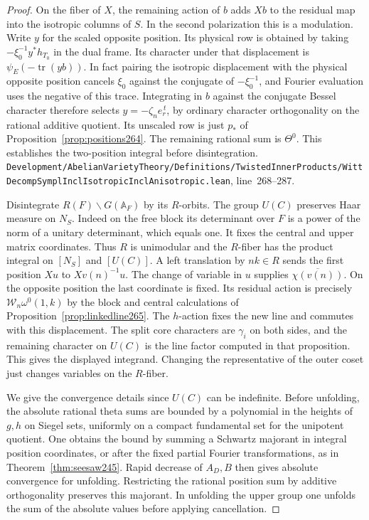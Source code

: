 \documentclass[a4paper,11pt]{article}
\theoremstyle{definition}
\theoremstyle{remark}
\newcommand{\srcloc}[2]{{\small\nolinkurl{#1.lean}}, line~#2}
\numberwithin{equation}{section}
\begin{document}
\begin{proof}
On the fiber of \(X\), the remaining action of \(b\) adds
\(Xb\) to the residual map into the isotropic columns of \(S\).
In the second polarization this is a modulation. Write \(y\)
for the scaled opposite position. Its physical row is obtained
by taking \(-\xi_0^{-1}y^*h_{T_0}\) in the dual frame.
Its character under that displacement is
\(\psi_E(-\operatorname{tr}(yb))\). In fact pairing the
isotropic displacement with the physical opposite position
cancels \(\xi_0\) against the conjugate of \(-\xi_0^{-1}\),
and Fourier evaluation uses the negative of this trace. Integrating
in \(b\) against the conjugate Bessel character therefore
selects \(y=-\zeta_n e_r^{\,t}\), by ordinary character
orthogonality on the rational additive quotient. Its unscaled
row is just \(p_*\) of Proposition~\ref{prop:positions264}.
The remaining rational sum is \(\Theta^0\). This establishes
the two-position integral before disintegration.
\srcloc{Development/AbelianVarietyTheory/Definitions/TwistedInnerProducts/WittDecompSymplInclIsotropicInclAnisotropic}{268--287}.

Disintegrate \(R(F)\backslash G(\mathbb A_F)\) by its \(R\)-orbits.
The group \(U(C)\) preserves Haar measure on \(N_S\). Indeed on
the free block its determinant over \(F\) is a power of the
norm of a unitary determinant, which equals one. It fixes the
central and upper matrix coordinates. Thus \(R\) is unimodular
and the \(R\)-fiber has the product integral on \([N_S]\) and
\([U(C)]\). A left translation by \(nk\in R\) sends the first
position \(Xu\) to \(Xv(n)^{-1}u\). The change of variable
in \(u\) supplies \(\overline{\chi(v(n))}\). On the opposite
position the last coordinate is fixed. Its residual action is
precisely \(\mathcal W_n\omega^0(1,k)\) by the block and
central calculations of Proposition~\ref{prop:linkedline265}.
The \(h\)-action fixes the new line and commutes with this
displacement. The split core characters are \(\gamma_i\) on both
sides, and the remaining character on \(U(C)\) is the line factor
computed in that proposition. This gives the displayed integrand.
Changing the representative of the outer coset just changes
variables on the \(R\)-fiber.

We give the convergence details since \(U(C)\) can be
indefinite. Before unfolding, the absolute rational theta
sums are bounded by a polynomial in the heights of \(g,h\)
on Siegel sets, uniformly on a compact fundamental set for
the unipotent quotient. One obtains the bound by summing a
Schwartz majorant in integral position coordinates, or after
the fixed partial Fourier transformations, as in
Theorem~\ref{thm:seesaw245}. Rapid decrease of \(A_D,B\)
then gives absolute convergence for unfolding. Restricting
the rational position sum by additive orthogonality preserves
this majorant. In unfolding the upper group one unfolds the
sum of the absolute values before applying cancellation.


\end{proof}
\end{document}

